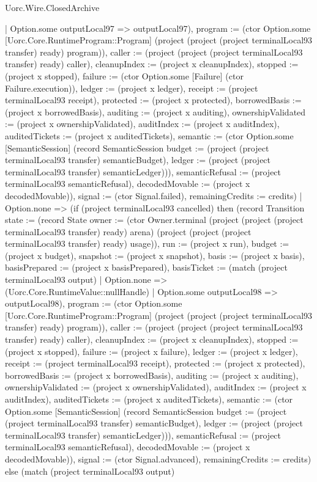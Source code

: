 \begin{lexlean}{Uorc.Wire.ClosedArchive}
\begin{semanticmodule}
{{{            | Option.some outputLocal97 => outputLocal97), program := (ctor Option.some [Uorc.Core.RuntimeProgram::Program] (project (project (project terminalLocal93 transfer) ready) program)), caller := (project (project (project terminalLocal93 transfer) ready) caller), cleanupIndex := (project x cleanupIndex), stopped := (project x stopped), failure := (ctor Option.some [Failure] (ctor Failure.execution)), ledger := (project x ledger), receipt := (project terminalLocal93 receipt), protected := (project x protected), borrowedBasis := (project x borrowedBasis), auditing := (project x auditing), ownershipValidated := (project x ownershipValidated), auditIndex := (project x auditIndex), auditedTickets := (project x auditedTickets), semantic := (ctor Option.some [SemanticSession] (record SemanticSession {budget := (project (project terminalLocal93 transfer) semanticBudget), ledger := (project (project terminalLocal93 transfer) semanticLedger)})), semanticRefusal := (project terminalLocal93 semanticRefusal), decodedMovable := (project x decodedMovable)}), signal := (ctor Signal.failed), remainingCredits := credits})
          | Option.none => (if (project terminalLocal93 cancelled) then (record Transition {state := (record State {owner := (ctor Owner.terminal (project (project (project terminalLocal93 transfer) ready) arena) (project (project (project terminalLocal93 transfer) ready) usage)), run := (project x run), budget := (project x budget), snapshot := (project x snapshot), basis := (project x basis), basisPrepared := (project x basisPrepared), basisTicket := (match (project terminalLocal93 output)
            | Option.none => (Uorc.Core.RuntimeValue::nullHandle)
            | Option.some outputLocal98 => outputLocal98), program := (ctor Option.some [Uorc.Core.RuntimeProgram::Program] (project (project (project terminalLocal93 transfer) ready) program)), caller := (project (project (project terminalLocal93 transfer) ready) caller), cleanupIndex := (project x cleanupIndex), stopped := (project x stopped), failure := (project x failure), ledger := (project x ledger), receipt := (project terminalLocal93 receipt), protected := (project x protected), borrowedBasis := (project x borrowedBasis), auditing := (project x auditing), ownershipValidated := (project x ownershipValidated), auditIndex := (project x auditIndex), auditedTickets := (project x auditedTickets), semantic := (ctor Option.some [SemanticSession] (record SemanticSession {budget := (project (project terminalLocal93 transfer) semanticBudget), ledger := (project (project terminalLocal93 transfer) semanticLedger)})), semanticRefusal := (project terminalLocal93 semanticRefusal), decodedMovable := (project x decodedMovable)}), signal := (ctor Signal.advanced), remainingCredits := credits}) else (match (project terminalLocal93 output)
}
\end{semanticmodule}
\end{lexlean}
